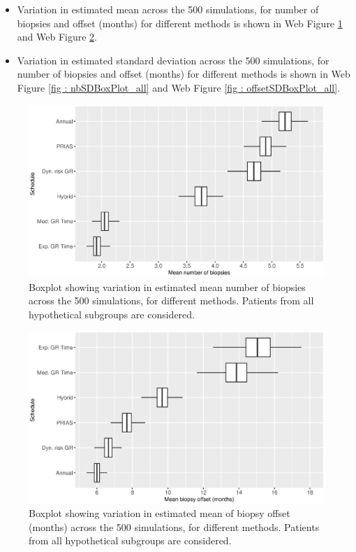 \begin{itemize}
  \item Variation in estimated mean across the 500 simulations, for number of biopsies and offset (months) for different methods is shown in Web Figure \ref{fig : nbMeanBoxPlot_all} and Web Figure \ref{fig : offsetMeanBoxPlot_all}.
  \item Variation in estimated standard deviation across the 500 simulations, for number of biopsies and offset (months) for different methods is shown in Web Figure \ref{fig : nbSDBoxPlot_all} and Web Figure \ref{fig : offsetSDBoxPlot_all}.
\end{itemize}

\begin{figure}[!htb]
\centerline{\includegraphics[width=\columnwidth]{images/sim_study/nbMeanBoxPlot_all.eps}}
\caption{Boxplot showing variation in estimated mean number of biopsies across the 500 simulations, for different methods. Patients from all hypothetical subgroups are considered.}
\label{fig : nbMeanBoxPlot_all}
\end{figure}

\begin{figure}[!htb]
\centerline{\includegraphics[width=\columnwidth]{images/sim_study/offsetMeanBoxPlot_all.eps}}
\caption{Boxplot showing variation in estimated mean of biopsy offset (months) across the 500 simulations, for different methods. Patients from all hypothetical subgroups are considered.}
\label{fig : offsetMeanBoxPlot_all}
\end{figure}

